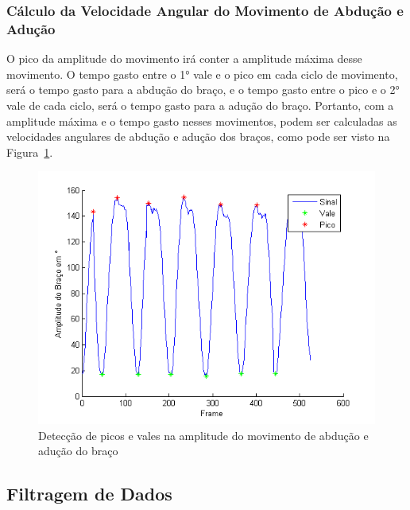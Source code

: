 \subsubsection{Cálculo da Velocidade Angular do Movimento de Abdução e Adução}
O pico da amplitude do movimento irá conter a amplitude máxima desse movimento. O tempo gasto entre o 1° vale e o pico em cada ciclo de movimento, será o tempo gasto para a abdução do braço, e o tempo gasto entre o pico e o 2° vale de cada ciclo, será o tempo gasto para a adução do braço. Portanto, com a amplitude máxima e o tempo gasto nesses movimentos, podem ser calculadas as velocidades angulares de abdução e adução dos braços, como pode ser visto na Figura~\ref{img:amplitude_braco_picos_vales}.
\begin{figure}[!htb]
     \centering
     \includegraphics[width=1\textwidth]{./img/amplitude-braco-picos.png}
     \caption{Detecção de picos e vales na amplitude do movimento de abdução e adução do braço}
     \label{img:amplitude_braco_picos_vales}
\end{figure}

\subsection{Filtragem de Dados}\label{section:filtro_dados}


